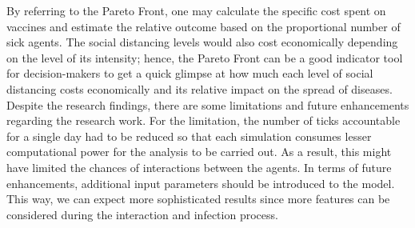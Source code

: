 \documentclass[smallextended]{svjour3}       %
\begin{document}
By referring to the Pareto Front, one may calculate the specific cost spent on vaccines and estimate the relative outcome based on the proportional number of sick agents. The social distancing levels would also cost economically depending on the level of its intensity; hence, the Pareto Front can be a good indicator tool for decision-makers to get a quick glimpse at how much each level of social distancing costs economically and its relative impact on the spread of diseases. Despite the research findings, there are some limitations and future enhancements regarding the research work. For the limitation, the number of ticks accountable for a single day had to be reduced so that each simulation consumes lesser computational power for the analysis to be carried out. As a result, this might have limited the chances of interactions between the agents. In terms of future enhancements, additional input parameters should be introduced to the model. This way, we can expect more sophisticated results since more features can be considered during the interaction and infection process.




\end{document}
